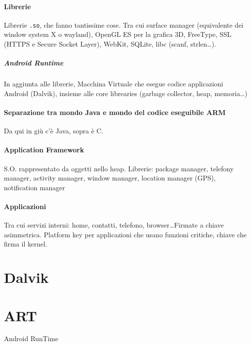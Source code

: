 \documentclass[10pt]{book}
\begin{document}
\paragraph{Librerie} Librerie \texttt{.so}, che fanno tantissime cose. Tra cui surface manager (equivalente dei window system X o wayland), OpenGL ES per la grafica 3D, FreeType, SSL (HTTPS e Secure Socket Layer), WebKit, SQLite, libc (scanf, strlen\ldots).
\subparagraph{Android Runtime} In aggiunta alle librerie, Macchina Virtuale che esegue codice applicazioni Android (Dalvik), insieme alle core librearies (garbage collector, heap, memoria\ldots)
\paragraph{Separazione tra mondo Java e mondo del codice eseguibile ARM} Da qui in giù c'è Java, sopra è C.
\paragraph{Application Framework} S.O. rappresentato da oggetti nello heap. Librerie: package manager, telefony manager, activity manager, window manager, location manager (GPS), notification manager
\paragraph{Applicazioni} Tra cui servizi interni: home, contatti, telefono, browser\ldots Firmate a chiave asimmetrica. Platform key per applicazioni che usano funzioni critiche, chiave che firma il kernel.
\section{Dalvik}
\section{ART}
Android RunTime
\end{document}

